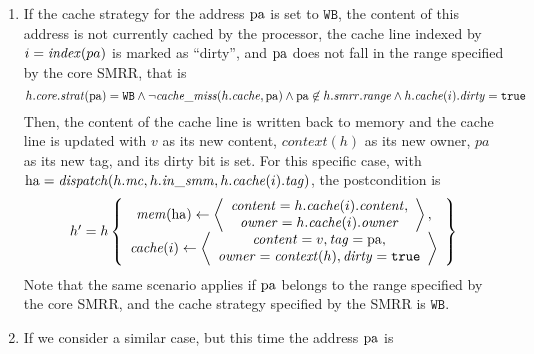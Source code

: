 \begin{enumerate}
\item If the cache strategy for the address \( \mathrm{pa} \) is set to
  \( \mathtt{WB} \), the content of this address is not currently cached by the
  processor, the cache line indexed by \( i = \mathit{index}(pa) \) is marked as
  ``dirty'', and \( \mathrm{pa} \) does not fall in the range specified by the core
  SMRR, that is
  \[
    h.\mathit{core}.\mathit{strat}(\mathrm{pa}) = \mathtt{WB} \wedge \neg
    \mathit{cache\_miss}(h.\mathit{cache}, \mathrm{pa}) \wedge \mathrm{pa} \not\in
    h.\mathit{smrr}.\mathit{range} \wedge h.\mathit{cache}(i).\mathit{dirty} =
    \mathtt{true}
  \]
  Then, the content of the cache line is written back to memory and the cache
  line is updated with \( v \) as its new content, \( context(h) \) as its new
  owner, \( pa \) as its new tag, and its dirty bit is set.
  For this specific case, with
  \( \mathrm{ha} = \mathit{dispatch}(h.\mathit{mc}, h.\mathit{in\_smm},
  h.\mathit{cache}(i).\mathit{tag}) \), the postcondition is
  \[
    \begin{array}{l}
      h' = h \left\{
      \begin{array}{c}
        \mathit{mem}(\mathrm{ha})
        \leftarrow \left<
        \begin{array}{c}
          \mathit{content} = h.\mathit{cache}(i).\mathit{content}, \\
          \mathit{owner} = h.\mathit{cache}(i).\mathit{owner} \\
        \end{array}
        \right>, \\
        \mathit{cache}(i) \leftarrow \left<
        \begin{array}{c}
          \mathit{content} = v, \mathit{tag} = \mathrm{pa}, \\
          \mathit{owner} = \mathit{context}(h), \mathit{dirty} = \mathtt{true}
        \end{array}
        \right>
      \end{array}
      \right\}
    \end{array}
  \]
  Note that the same scenario applies if \( \mathrm{pa} \) belongs to the range
  specified by the core SMRR, and the cache strategy specified by the SMRR is
  \( \mathtt{WB} \).
\item If we consider a similar case, but this time the address \( \mathrm{pa} \) is

\end{enumerate}
